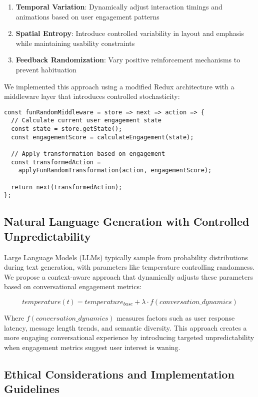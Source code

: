 \documentclass{article}
\begin{document}
\begin{enumerate}
    \item \textbf{Temporal Variation}: Dynamically adjust interaction timings and animations based on user engagement patterns
    \item \textbf{Spatial Entropy}: Introduce controlled variability in layout and emphasis while maintaining usability constraints
    \item \textbf{Feedback Randomization}: Vary positive reinforcement mechanisms to prevent habituation
\end{enumerate}

We implemented this approach using a modified Redux architecture with a middleware layer that introduces controlled stochasticity:

\begin{verbatim}
const funRandomMiddleware = store => next => action => {
  // Calculate current user engagement state
  const state = store.getState();
  const engagementScore = calculateEngagement(state);
  
  // Apply transformation based on engagement
  const transformedAction = 
    applyFunRandomTransformation(action, engagementScore);
  
  return next(transformedAction);
};
\end{verbatim}

\subsection{Natural Language Generation with Controlled Unpredictability}

Large Language Models (LLMs) typically sample from probability distributions during text generation, with parameters like temperature controlling randomness. We propose a context-aware approach that dynamically adjusts these parameters based on conversational engagement metrics:

\begin{equation}
temperature(t) = temperature_{base} + \lambda \cdot f(conversation\_dynamics)
\end{equation}

Where $f(conversation\_dynamics)$ measures factors such as user response latency, message length trends, and semantic diversity. This approach creates a more engaging conversational experience by introducing targeted unpredictability when engagement metrics suggest user interest is waning.

\subsection{Ethical Considerations and Implementation Guidelines}
\end{document}
